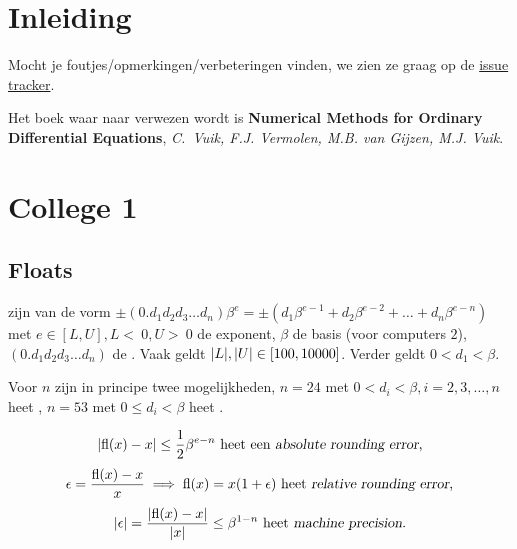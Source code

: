 \documentclass{2wn20summary}
\begin{document}
	\maketitle
	\thispagestyle{empty}
	\newpage
	
	\section{Inleiding}
	
	Mocht je foutjes/opmerkingen/verbeteringen vinden, we zien ze graag op de \href{https://github.com/PHPirates/2WN20-summary/issues}{issue tracker}.
	
	Het boek waar naar verwezen wordt is \textbf{Numerical Methods for Ordinary Differential Equations}, \textit{C.~Vuik, F.J. Vermolen, M.B. van Gijzen, M.J. Vuik}.

	\section{College 1}
	\subsection{Floats}
		 zijn van de vorm $\pm (0.d_1 d_2 d_3 \dots d_n)\beta^e = \pm  (d_1 \beta^{e-1}+d_2 \beta^{e-2}+\dots + d_n \beta^{e-n})$ met $e \in [L,U], L<~0, U>~0$ de exponent, $\beta$ de basis (voor computers $2$), $(0.d_1 d_2 d_3 \dots d_n)$ de . Vaak geldt ${\left|L\right|},{\left|U\right|} \in [100,10000]$. Verder geldt $ 0 < d_1 < \beta $.
		
		\begin{define}
		Voor $n$ zijn in principe twee mogelijkheden, $n=24$ met $0<d_i<\beta, i=2,3,\dotsc ,n$ heet , $n=53$ met $0 \le d_i < \beta$ heet . 
		\end{define}
		
		\begin{define}
			\[
				\abs{\fl(x)-x} \le \frac{1}{2} \beta^{e-n} \text{ heet een \indx{absolute rounding error},}
			\]
			\[
				\epsilon = \frac{\fl(x) - x}{x} \implies \fl(x) = x(1 + \epsilon) \text{ heet \indx{relative rounding error},}
			\]
			\[ 
				\abs{\epsilon} = \frac{\abs{\fl (x) - x}}{\abs{x}} \leq \beta^{1-n} \text{ heet \indx{machine precision}.}
			\]
		\end{define}
		
\end{document}
